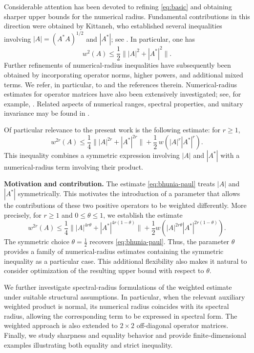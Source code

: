\documentclass[final,1p,times]{elsarticle}
\begin{document}
Considerable attention has been devoted to refining \eqref{eq:basic} and
obtaining sharper upper bounds for the numerical radius. Fundamental
contributions in this direction were obtained by Kittaneh, who established
several inequalities involving $|A|=(A^*A)^{1/2}$ and $|A^*|$; see
\cite{Kittaneh1,Kittaneh2,KittanehNorm}. In particular, one has
\begin{equation}\label{eq:kittaneh}
w^2(A)
\leq
\frac12\big\||A|^2+|A^*|^2\big\|.
\end{equation}
Further refinements of numerical-radius inequalities have subsequently been
obtained by incorporating operator norms, higher powers, and additional
mixed terms. We refer, in particular, to
\cite{AbuOmarKittaneh,Dragomir,BhuniaPaulBSM,BhuniaPaulArch,
BhuniaPaulResults,BhuniaPaulLMA,Kato}
and the references therein. Numerical-radius estimates for operator matrices
have also been extensively investigated; see, for example,
\cite{Alomari,BhuniaPaulLMA}. Related aspects of numerical ranges, spectral
properties, and unitary invariance may be found in
\cite{FongHolbrook,HornJohnson}.

Of particular relevance to the present work is the following estimate: for
$r\geq1$,
\begin{equation}\label{eq:bhunia-paul}
w^{2r}(A)
\leq
\frac14\big\||A|^{2r}+|A^*|^{2r}\big\|
+
\frac12\,w\!\left(|A|^r|A^*|^r\right).
\end{equation}
This inequality combines a symmetric expression involving $|A|$ and $|A^*|$
with a numerical-radius term involving their product.

\medskip

\noindent\textbf{Motivation and contribution.}
The estimate \eqref{eq:bhunia-paul} treats $|A|$ and $|A^*|$ symmetrically.
This motivates the introduction of a parameter that allows the contributions
of these two positive operators to be weighted differently. More precisely,
for $r\geq1$ and $0\leq\theta\leq1$, we establish the estimate
\[
w^{2r}(A)
\leq
\frac14
\big\|
|A|^{4r\theta}
+
|A^*|^{4r(1-\theta)}
\big\|
+
\frac12
w\!\left(
|A|^{2r\theta}|A^*|^{2r(1-\theta)}
\right).
\]
The symmetric choice $\theta=\frac12$ recovers
\eqref{eq:bhunia-paul}. Thus, the parameter $\theta$ provides a family of
numerical-radius estimates containing the symmetric inequality as a
particular case. This additional flexibility also makes it natural to
consider optimization of the resulting upper bound with respect to
$\theta$.

We further investigate spectral-radius formulations of the weighted estimate
under suitable structural assumptions. In particular, when the relevant
auxiliary weighted product is normal, its numerical radius coincides with its
spectral radius, allowing the corresponding term to be expressed in spectral
form. The weighted approach is also extended to $2\times2$ off-diagonal
operator matrices. Finally, we study sharpness and equality behavior and
provide finite-dimensional examples illustrating both equality and strict
inequality.
\end{document}
